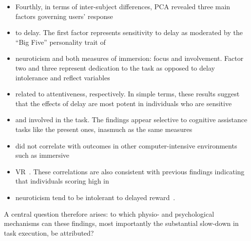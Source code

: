 \begin{itemize}
    \item Fourthly, in terms of inter-subject differences, PCA revealed three main factors governing users' response
    \item to delay.
    The first factor represents sensitivity to delay as moderated by the ``Big Five'' personality trait of
    \item neuroticism and both measures of immersion: focus and involvement.
    Factor two and three represent dedication to the task as opposed to delay intolerance and reflect variables
    \item related to attentiveness, respectively.
    In simple terms, these results suggest that the effects of delay are most potent in individuals who are sensitive
    \item and involved in the task.
    The findings appear selective to cognitive assistance tasks like the present ones, inasmuch as the same measures
    \item did not correlate with outcomes in other computer-intensive environments such as immersive
    \item VR~\cite{quesnel2018you}.
    These correlations are also consistent with previous findings indicating that individuals scoring high in
    \item neuroticism tend to be intolerant to delayed reward~\cite{hirsh2008delay}.
\end{itemize}

A central question therefore arises: to which physio- and psychological mechanisms can these findings, most
importantly the substantial slow-down in task execution, be attributed?

